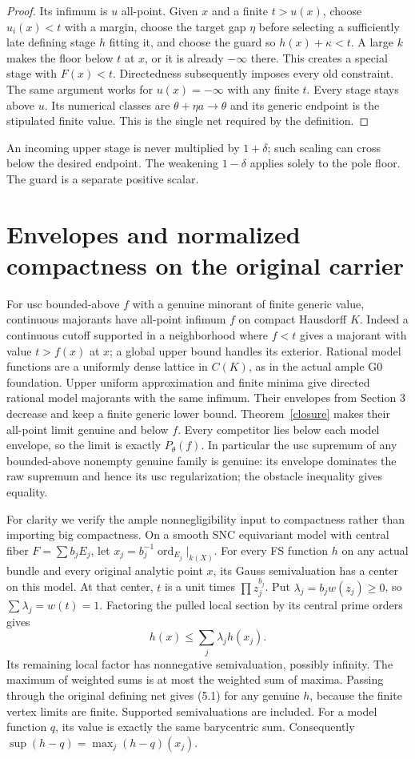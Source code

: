 \documentclass[10pt]{article}
\begin{document}
\begin{proof}
Its infimum is $u$ all-point. Given $x$ and a finite $t>u(x)$, choose
$u_i(x)<t$ with a margin, choose the target gap $\eta$ before selecting a
sufficiently late defining stage $h$ fitting it, and choose the guard so
$h(x)+\kappa<t$. A large $k$ makes the floor below $t$ at $x$, or it is
already $-\infty$ there. This creates a special stage with $F(x)<t$.
Directedness subsequently imposes every old constraint. The same argument
works for $u(x)=-\infty$ with any finite $t$. Every stage stays above $u$.
Its numerical classes are $\theta+\eta a\to\theta$ and its generic endpoint
is the stipulated finite value. This is the single net required by the definition.
\end{proof}

An incoming upper stage is never multiplied by $1+\delta$; such scaling can
cross below the desired endpoint. The weakening $1-\delta$ applies solely
to the pole floor. The guard is a separate positive scalar.

\section{Envelopes and normalized compactness on the original carrier}
For usc bounded-above $f$ with a genuine minorant of finite generic value,
continuous majorants have all-point infimum $f$ on compact Hausdorff $K$.
Indeed a continuous cutoff supported in a neighborhood where $f<t$ gives a
majorant with value $t>f(x)$ at $x$; a global upper bound handles its exterior.
Rational model functions are a uniformly dense lattice in $C(K)$, as in the
actual ample G0 foundation. Upper uniform approximation and finite minima
give directed rational model majorants with the same infimum. Their envelopes
from Section 3 decrease and keep a finite generic lower bound. Theorem~\ref{closure}
makes their all-point limit genuine and below $f$. Every competitor lies below
each model envelope, so the limit is exactly $P_\theta(f)$. In particular the
usc supremum of any bounded-above nonempty genuine family is genuine: its
envelope dominates the raw supremum and hence its usc regularization; the
obstacle inequality gives equality.

For clarity we verify the ample nonnegligibility input to compactness rather
than importing big compactness. On a smooth SNC equivariant model with
central fiber $F=\sum b_jE_j$, let $x_j=b_j^{-1}\operatorname{ord}_{E_j}|_{k(X)}$.
For every FS function $h$ on any actual bundle and every original analytic
point $x$, its Gauss semivaluation has a center on this model. At that center,
$t$ is a unit times $\prod z_j^{b_j}$. Put
$\lambda_j=b_jw(z_j)\geq0$, so $\sum\lambda_j=w(t)=1$.
Factoring the pulled local section by its central prime orders gives
\[
 h(x)\leq\sum_j\lambda_jh(x_j).                     \tag{5.1}
\]
Its remaining local factor has nonnegative semivaluation, possibly infinity.
The maximum of weighted sums is at most the weighted sum of maxima. Passing
through the original defining net gives (5.1) for any genuine $h$, because the
finite vertex limits are finite. Supported semivaluations are included.
For a model function $q$, its value is exactly the same barycentric sum.
Consequently $\sup(h-q)=\max_j(h-q)(x_j)$.
\end{document}

